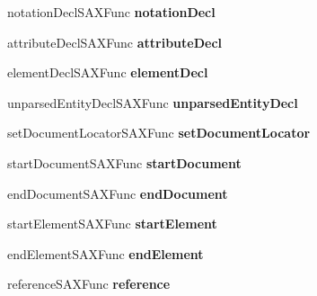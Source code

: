 \begin{DoxyCompactItemize}
notation\+Decl\+S\+A\+X\+Func {\bfseries notation\+Decl}
\item 
\mbox{\label{struct__xml_s_a_x_handler_v1_a0624527c2beaba134403534d02e4820f}} 
attribute\+Decl\+S\+A\+X\+Func {\bfseries attribute\+Decl}
\item 
\mbox{\label{struct__xml_s_a_x_handler_v1_a3248ebecb4a1b7eec246a535fe6bf08a}} 
element\+Decl\+S\+A\+X\+Func {\bfseries element\+Decl}
\item 
\mbox{\label{struct__xml_s_a_x_handler_v1_a91fa23c451584de06af7c0755e63e310}} 
unparsed\+Entity\+Decl\+S\+A\+X\+Func {\bfseries unparsed\+Entity\+Decl}
\item 
\mbox{\label{struct__xml_s_a_x_handler_v1_ac607d4e2516d15e6ec10ea276ecdbfb2}} 
set\+Document\+Locator\+S\+A\+X\+Func {\bfseries set\+Document\+Locator}
\item 
\mbox{\label{struct__xml_s_a_x_handler_v1_a1093326e92c519ef0298ab822933d2b1}} 
start\+Document\+S\+A\+X\+Func {\bfseries start\+Document}
\item 
\mbox{\label{struct__xml_s_a_x_handler_v1_a1cbd8f841c309cfc63973e75650a5aaf}} 
end\+Document\+S\+A\+X\+Func {\bfseries end\+Document}
\item 
\mbox{\label{struct__xml_s_a_x_handler_v1_a311b1f74f2f6d0d167addfc49d39a435}} 
start\+Element\+S\+A\+X\+Func {\bfseries start\+Element}
\item 
\mbox{\label{struct__xml_s_a_x_handler_v1_ab62cf4d2df8209f439865179aaa641b9}} 
end\+Element\+S\+A\+X\+Func {\bfseries end\+Element}
\item 
\mbox{\label{struct__xml_s_a_x_handler_v1_a88ed76850bc465258f158010f0c3c9be}} 
reference\+S\+A\+X\+Func {\bfseries reference}
\item 
\mbox{\label{struct__xml_s_a_x_handler_v1_a151b79b5c8ee8e05e10d69cb53953800}} 

\end{DoxyCompactItemize}
